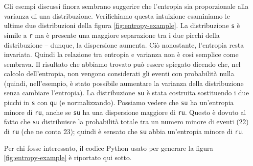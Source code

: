 \documentclass[
  10pt,
  italian,
  a4paper,
  extrafontsizes,onecolumn,openright
  ]{memoir}
\theoremstyle{definition}
\theoremstyle{definition}
\theoremstyle{definition}
\theoremstyle{definition}
\theoremstyle{remark}
\begin{document}
Gli esempi discussi finora sembrano suggerire che l'entropia sia proporzionale alla varianza di una distribuzione. Verifichiamo questa intuizione esaminiamo le ultime due distribuzioni della figura \ref{fig:entropy-example}. La distribuzione \texttt{s} è simile a \texttt{r} ma è presente una maggiore separazione tra i due picchi della distribuzione -- dunque, la dispersione aumenta. Ciò nonostante, l'entropia resta invariata. Quindi la relazione tra entropia e varianza non è così semplice come sembrava. Il risultato che abbiamo trovato può essere spiegato dicendo che, nel calcolo dell'entropia, non vengono considerati gli eventi con probabilità nulla (quindi, nell'esempio, è stato possibile aumentare la varianza della distribuzione senza cambiare l'entropia). La distribuzione \texttt{su} è stata costruita sostituendo i due picchi in \texttt{s} con \texttt{qu} (e normalizzando). Possiamo vedere che \texttt{su} ha un'entropia minore di \texttt{ru}, anche se \texttt{su} ha una dispersione maggiore di \texttt{ru}. Questo è dovuto al fatto che \texttt{su} distribuisce la probabilità totale tra un numero minore di eventi (22) di \texttt{ru} (che ne conta 23); quindi è sensato che \texttt{su} abbia un'entropia minore di \texttt{ru}.

Per chi fosse interessato, il codice Python usato per generare la figura \ref{fig:entropy-example} è riportato qui sotto.
\end{document}
